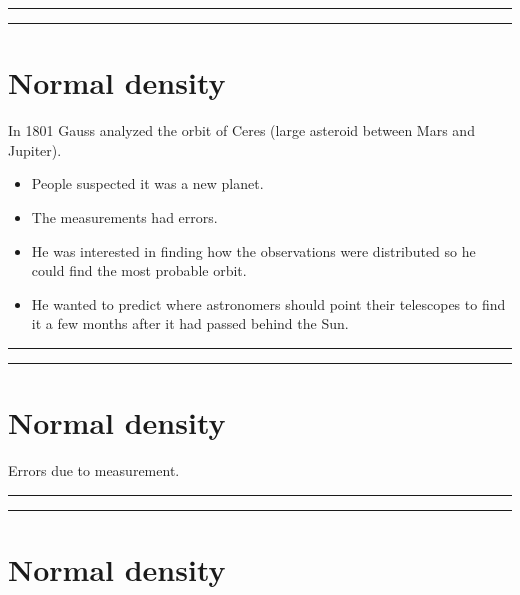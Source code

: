\documentclass[
]{book}
\providecommand{\tightlist}{%
  \setlength{\itemsep}{0pt}\setlength{\parskip}{0pt}}
\begin{document}
\begin{center}\rule{0.5\linewidth}{0.5pt}\end{center}

\begin{center}\rule{0.5\linewidth}{0.5pt}\end{center}

\hypertarget{normal-density}{%
\section{Normal density}\label{normal-density}}

In 1801 Gauss analyzed the orbit of Ceres (large asteroid between Mars and Jupiter).

\begin{itemize}
\tightlist
\item
  People suspected it was a new planet.
\item
  The measurements had errors.
\item
  He was interested in finding how the observations were distributed so he could find the most probable orbit.
\item
  He wanted to predict where astronomers should point their telescopes to find it a few months after it had passed behind the Sun.
\end{itemize}

\begin{center}\rule{0.5\linewidth}{0.5pt}\end{center}

\begin{center}\rule{0.5\linewidth}{0.5pt}\end{center}

\hypertarget{normal-density-1}{%
\section{Normal density}\label{normal-density-1}}

Errors due to measurement.

\begin{center}\rule{0.5\linewidth}{0.5pt}\end{center}

\begin{center}\rule{0.5\linewidth}{0.5pt}\end{center}

\hypertarget{normal-density-2}{%
\section{Normal density}\label{normal-density-2}}
\end{document}
